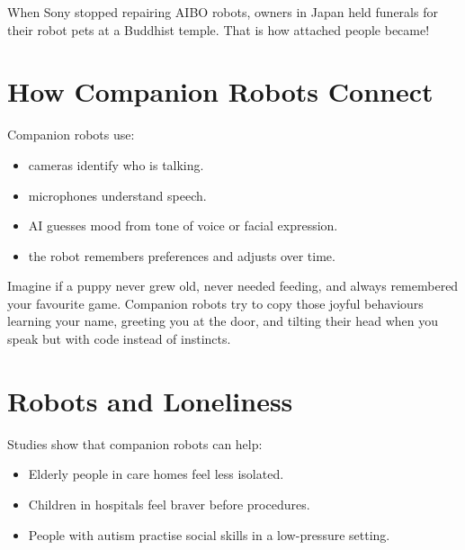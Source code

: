 \begin{funfact}
  When Sony stopped repairing AIBO robots, owners in Japan held
  funerals for their robot pets at a Buddhist temple.
  That is how attached people became!
\end{funfact}

\sectionrule

\section*{How Companion Robots Connect}

Companion robots use:
\begin{itemize}
  \item \textbf{} \textemdash{} cameras identify who is talking.
  \item \textbf{} \textemdash{} microphones understand speech.
  \item \textbf{} \textemdash{} AI guesses mood from tone of voice or facial expression.
  \item \textbf{} \textemdash{} the robot remembers preferences and adjusts over time.
\end{itemize}

\begin{picturethis}
  Imagine if a puppy never grew old, never needed feeding, and always
  remembered your favourite game. Companion robots try to copy those
  joyful behaviours \textemdash{} learning your name, greeting you at the door,
  and tilting their head when you speak \textemdash{} but with code instead
  of instincts.
\end{picturethis}

\sectionrule

\section*{Robots and Loneliness}

Studies show that companion robots can help:
\begin{itemize}
  \item Elderly people in care homes feel less isolated.
  \item Children in hospitals feel braver before procedures.
  \item People with autism practise social skills in a low-pressure setting.
\end{itemize}

